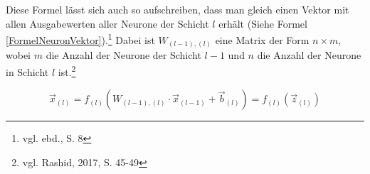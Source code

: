 \documentclass[
	a4paper,
	12pt,
	ngerman,
	oneside
]{scrreprt}											%
\begin{document}
			Diese Formel lässt sich auch so aufschreiben, dass man gleich einen Vektor mit allen Ausgabewerten aller Neurone der Schicht $l$ erhält (Siehe Formel \ref{FormelNeuronVektor}).\footnote{vgl. ebd., S. 8} Dabei ist $W_{(l-1),(l)}$ eine Matrix der Form $n\times m$, wobei $m$ die Anzahl der Neurone der Schicht $l-1$ und $n$ die Anzahl der Neurone in Schicht $l$ ist.\footnote{vgl. Rashid, 2017, S. 45-49}
			
			\begin{equation}\label{FormelNeuronVektor}
				\vec{x}_{(l)} = f_{(l)}(W_{(l-1),(l)} \cdot \vec{x}_{(l-1)} + \vec{b}_{(l)})  = f_{(l)}(\vec{z}_{(l)})
			\end{equation}
			
			
\end{document}
